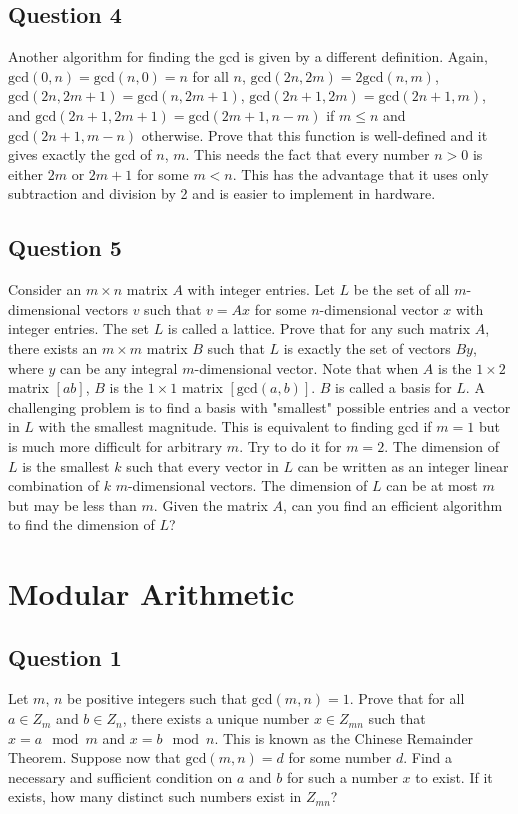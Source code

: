 \documentclass[12pt]{report}
\begin{document}
\section*{Question 4}
Another algorithm for finding the gcd is given by a different definition. Again, $\text{gcd}(0, n) = \text{gcd}(n, 0) = n$ for all $n$, $\text{gcd}(2n, 2m) = 2\text{gcd}(n, m)$, $\text{gcd}(2n, 2m + 1) = \text{gcd}(n, 2m+1)$, $\text{gcd}(2n+1, 2m) = \text{gcd}(2n+1, m)$, and $\text{gcd}(2n+1, 2m+1) = \text{gcd}(2m+1, n-m)$ if $m \leq n$ and $\text{gcd}(2n + 1, m - n)$ otherwise. Prove that this function is well-defined and it gives exactly the gcd of $n$, $m$. This needs the fact that every number $n > 0$ is either $2m$ or $2m + 1$ for some $m < n$. This has the advantage that it uses only subtraction and division by 2 and is easier to implement in hardware.

\section*{Question 5}
Consider an $m \times n$ matrix $A$ with integer entries. Let $L$ be the set of all $m$-dimensional vectors $v$ such that $v = Ax$ for some $n$-dimensional vector $x$ with integer entries. The set $L$ is called a lattice. Prove that for any such matrix $A$, there exists an $m \times m$ matrix $B$ such that $L$ is exactly the set of vectors $By$, where $y$ can be any integral $m$-dimensional vector. Note that when $A$ is the $1 \times 2$ matrix $[ab]$, $B$ is the $1 \times 1$ matrix $[\text{gcd}(a, b)]$. $B$ is called a basis for $L$. A challenging problem is to find a basis with "smallest" possible entries and a vector in $L$ with the smallest magnitude. This is equivalent to finding gcd if $m = 1$ but is much more difficult for arbitrary $m$. Try to do it for $m = 2$. The dimension of $L$ is the smallest $k$ such that every vector in $L$ can be written as an integer linear combination of $k$ $m$-dimensional vectors. The dimension of $L$ can be at most $m$ but may be less than $m$. Given the matrix $A$, can you find an efficient algorithm to find the dimension of $L$?

\chapter{Modular Arithmetic}
\section*{Question 1}
Let $m$, $n$ be positive integers such that $\text{gcd}(m, n) = 1$. Prove that for all $a \in Z_m$ and $b \in Z_n$, there exists a unique number $x \in Z_{mn}$ such that $x = a \mod m$ and $x = b \mod n$. This is known as the Chinese Remainder Theorem. Suppose now that $\text{gcd}(m, n) = d$ for some number $d$. Find a necessary and sufficient condition on $a$ and $b$ for such a number $x$ to exist. If it exists, how many distinct such numbers exist in $Z_{mn}$?
\end{document}
